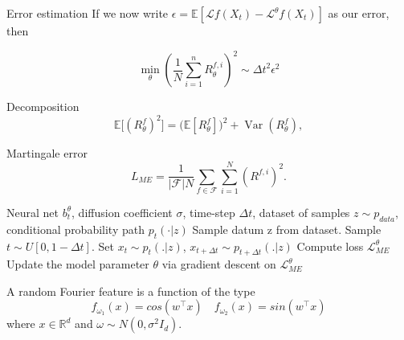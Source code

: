 \documentclass{beamer}
\begin{document}
\begin{frame}
	\begin{block}{Error estimation}
	If we now write $\epsilon = \mathbb{E}[\mathcal{L}f(X_t) - \mathcal{L}^\theta f(X_t)]$ as our error, then 

	\begin{equation}
		\min_\theta \left( \frac{1}{N} \sum_{i=1}^n R_\theta^{f, i}\right)^2 \sim {\Delta t}^2 \epsilon^2
		\label{eq:order}
	\end{equation}
	\end{block}
\end{frame}

\begin{frame}
	\begin{block}{Decomposition}
\[
    \mathbb{E}\bigl[(R_\theta^f)^2\bigr]
    =
    \bigl(\mathbb{E}[R_\theta^f]\bigr)^2
    +
    \operatorname{Var}(R_\theta^f),
\]
	\end{block}

	\begin{block}{Martingale error}
		\begin{equation}
			\label{best_loss}
			L_{ME} = \frac{1}{|\mathcal{F}|N} \sum_{f \in \mathcal{F}} \sum_{i=1}^{N} (R^{f, i})^2.
		\end{equation}
	\end{block}
\end{frame}

\begin{frame}
	\begin{algorithm}[H]
	\caption{Martingale Matching}\label{alg:mm}
	\begin{algorithmic}
		\Require Neural net $b_t^{\theta}$, diffusion coefficient $\sigma$, time-step $\Delta t$, dataset of samples $z \sim p_{data}$, conditional probability path $p_t(\cdot|z)$
		\State Sample datum z from dataset.
		\State Sample $t \sim U[0,1-\Delta t]$.
		\State Set $x_t \sim p_t(.|z)$, $x_{t+\Delta t} \sim p_{t + \Delta t}(.|z)$
		\State Compute loss $\mathcal{L}_{ME}^\theta$
		\State Update the model parameter $\theta$ via gradient descent on $\mathcal{L}_{ME}^{\theta}$
		\EndFor	
	\end{algorithmic}
\end{algorithm}
\end{frame}

\begin{frame}
\begin{definition}
	A random Fourier feature is a function of the type 
	\begin{equation*}
		f_{\omega_1}(x) = cos(w^\intercal x) \quad f_{\omega_2}(x) = sin(w^\intercal x)
	\end{equation*}
	where $x \in \mathbb{R}^d$ and $\omega \sim N(0, \sigma^2 I_d)$.
\end{definition}
\end{frame}
\end{document}
